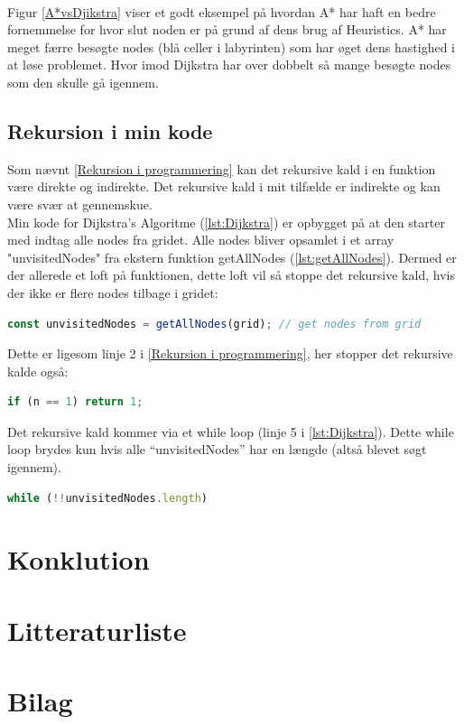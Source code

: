\documentclass[12pt]{article}
\begin{document}
\\Figur \ref{A*vsDjikstra} viser et godt eksempel på hvordan A* har haft en bedre fornemmelse for hvor slut noden er på grund af dens brug af Heuristics. A* har meget færre besøgte nodes (blå celler i labyrinten) som har øget dens hastighed i at løse problemet. 
Hvor imod Dijkstra har over dobbelt så mange besøgte nodes som den skulle gå igennem. 
\newpage
\subsection{Rekursion i min kode}
Som nævnt \ref{Rekursion i programmering} kan det rekursive kald i en funktion være direkte og indirekte. 
Det rekursive kald i mit tilfælde er indirekte og kan være svær at gennemskue. \\
Min kode for Dijkstra’s Algoritme (\ref{lst:Dijkstra}) er opbygget på at den starter med indtag alle nodes 
fra gridet. Alle nodes bliver opsamlet i et array "unvisitedNodes" fra ekstern funktion getAllNodes (\ref{lst:getAllNodes}). Dermed er der allerede et loft på funktionen, 
dette loft vil så stoppe det rekursive kald, hvis der ikke er flere nodes tilbage i gridet:
\begin{lstlisting}[language=JavaScript]
const unvisitedNodes = getAllNodes(grid); // get nodes from grid
\end{lstlisting}
Dette er ligesom linje 2 i \ref{Rekursion i programmering}, her stopper det rekursive kalde også: 
\begin{lstlisting}[language=JavaScript]
if (n == 1) return 1;
\end{lstlisting}
Det rekursive kald kommer via et while loop (linje 5 i \ref{lst:Dijkstra}). 
Dette while loop brydes kun hvis alle “unvisitedNodes” har en længde (altså blevet søgt igennem). 
\begin{lstlisting}[language=JavaScript]
while (!!unvisitedNodes.length)
\end{lstlisting}

\section{Konklution}

\section{Litteraturliste}

\newpage
\section{Bilag}
\end{document}
